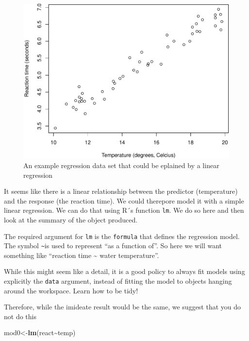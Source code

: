 \documentclass[
]{book}
\newenvironment{Shaded}{\begin{snugshade}}{\end{snugshade}}
\newcommand{\FunctionTok}[1]{\textcolor[rgb]{0.13,0.29,0.53}{\textbf{#1}}}
\newcommand{\NormalTok}[1]{#1}
\newcommand{\OtherTok}[1]{\textcolor[rgb]{0.56,0.35,0.01}{#1}}
\newcommand{\SpecialCharTok}[1]{\textcolor[rgb]{0.81,0.36,0.00}{\textbf{#1}}}
\begin{document}
\begin{figure}

{\centering \includegraphics[width=0.8\linewidth]{ECOMODbook_files/figure-latex/Freg-1} 

}

\caption{An example regression data set that could be eplained by a linear regression}\label{fig:Freg}
\end{figure}

It seems like there is a linear relationship between the predictor (temperature) and the response (the reaction time). We could therepore model it with a simple linear regression. We can do that using R´s function \texttt{lm}. We do so here and then look at the summary of the object produced.

The required argument for \texttt{lm} is the \texttt{formula} that defines the regression model. The symbol \texttt{\textasciitilde{}}is used to represent ``as a function of''. So here we will want something like ``reaction time \textasciitilde{} water temperature''.

While this might seem like a detail, it is a good policy to always fit models using explicitly the \texttt{data} argument, instead of fitting the model to objects hanging around the workspace. Learn how to be tidy!

Therefore, while the imideate result would be the same, we suggest that you do not do this

\begin{Shaded}
\begin{Highlighting}[]
\NormalTok{mod0}\OtherTok{\textless{}{-}}\FunctionTok{lm}\NormalTok{(react}\SpecialCharTok{\textasciitilde{}}\NormalTok{temp)}
\end{Highlighting}
\end{Shaded}
\end{document}
